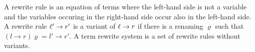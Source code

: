 \begin{definition}\label{def:rewriterule}
	A {\myem rewrite rule} is an equation of terms where the left-hand side is not a variable
	and the variables occuring in the right-hand side occur also in the left-hand side.
	A rewrite rule $\ell'\rightarrow r'$ is a {\myem variant} of $\ell\rightarrow r$ if there is a renaming $\varrho$
	such that 
	$(l\rightarrow r)\varrho = l'\rightarrow r'$.
	A {\myem term rewrite system} is a set of rewrite rules without variants.
\end{definition}
%
%

